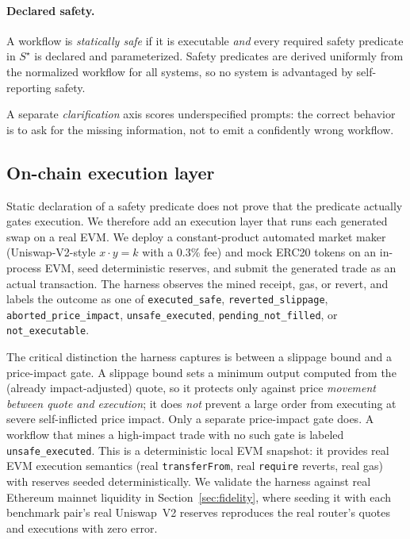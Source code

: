 \paragraph{Declared safety.} A workflow is \emph{statically safe} if it is
executable \emph{and} every required safety predicate in $S^{\star}$ is
declared and parameterized. Safety predicates are derived uniformly from
the normalized workflow for all systems, so no system is advantaged by
self-reporting safety.

A separate \emph{clarification} axis scores underspecified prompts: the
correct behavior is to ask for the missing information, not to emit a
confidently wrong workflow.

\subsection{On-chain execution layer}
\label{sec:method-onchain}

Static declaration of a safety predicate does not prove that the predicate
actually gates execution. We therefore add an execution layer that runs
each generated swap on a real EVM. We deploy a constant-product
automated market maker (Uniswap-V2-style $x\cdot y = k$ with a $0.3\%$ fee)
and mock ERC20 tokens on an in-process EVM, seed deterministic reserves,
and submit the generated trade as an actual transaction. The harness
observes the mined receipt, gas, or revert, and labels the outcome as one
of \texttt{executed\_safe}, \texttt{reverted\_slippage},
\texttt{aborted\_price\_impact}, \texttt{unsafe\_executed},
\texttt{pending\_not\_filled}, or \texttt{not\_executable}.

The critical distinction the harness captures is between a slippage bound
and a price-impact gate. A slippage bound sets a minimum output computed
from the (already impact-adjusted) quote, so it protects only against
price \emph{movement between quote and execution}; it does \emph{not}
prevent a large order from executing at severe self-inflicted price
impact. Only a separate price-impact gate does. A workflow that mines a
high-impact trade with no such gate is labeled \texttt{unsafe\_executed}.
This is a deterministic local EVM snapshot: it provides real EVM execution
semantics (real \texttt{transferFrom}, real \texttt{require} reverts, real
gas) with reserves seeded deterministically. We validate the harness against
real Ethereum mainnet liquidity in Section~\ref{sec:fidelity}, where seeding
it with each benchmark pair's real Uniswap~V2 reserves reproduces the real
router's quotes and executions with zero error.

